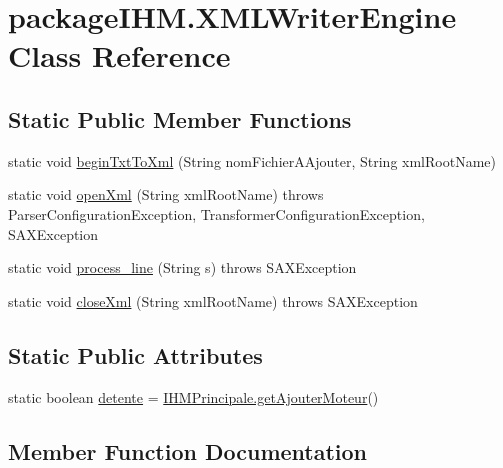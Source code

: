 \hypertarget{classpackage_i_h_m_1_1_x_m_l_writer_engine}{}\section{package\+I\+H\+M.\+X\+M\+L\+Writer\+Engine Class Reference}
\label{classpackage_i_h_m_1_1_x_m_l_writer_engine}
\subsection*{Static Public Member Functions}
\begin{DoxyCompactItemize}
\item 
static void \mbox{\hyperlink{classpackage_i_h_m_1_1_x_m_l_writer_engine_a034600829c2639024d05ca1f8817548d}{begin\+Txt\+To\+Xml}} (String nom\+Fichier\+A\+Ajouter, String xml\+Root\+Name)
\item 
static void \mbox{\hyperlink{classpackage_i_h_m_1_1_x_m_l_writer_engine_a232a93b9139813d46e3124712864054d}{open\+Xml}} (String xml\+Root\+Name)  throws Parser\+Configuration\+Exception, Transformer\+Configuration\+Exception, S\+A\+X\+Exception 
\item 
static void \mbox{\hyperlink{classpackage_i_h_m_1_1_x_m_l_writer_engine_ac18b22451d5382bfd52862c7c409334d}{process\+\_\+line}} (String s)  throws S\+A\+X\+Exception 
\item 
static void \mbox{\hyperlink{classpackage_i_h_m_1_1_x_m_l_writer_engine_a7f0d2ba3ee92e5dd2297f7b4c37eb756}{close\+Xml}} (String xml\+Root\+Name)  throws S\+A\+X\+Exception 
\end{DoxyCompactItemize}
\subsection*{Static Public Attributes}
\begin{DoxyCompactItemize}
\item 
static boolean \mbox{\hyperlink{classpackage_i_h_m_1_1_x_m_l_writer_engine_a085cb96009b631ffd6a02feb519edb17}{detente}} = \mbox{\hyperlink{classpackage_i_h_m_1_1_i_h_m_principale_a35c976eb40d2eef2dbb89b2b0befb0fb}{I\+H\+M\+Principale.\+get\+Ajouter\+Moteur}}()
\end{DoxyCompactItemize}


\subsection{Member Function Documentation}
\mbox{\label{classpackage_i_h_m_1_1_x_m_l_writer_engine_a034600829c2639024d05ca1f8817548d}} 
